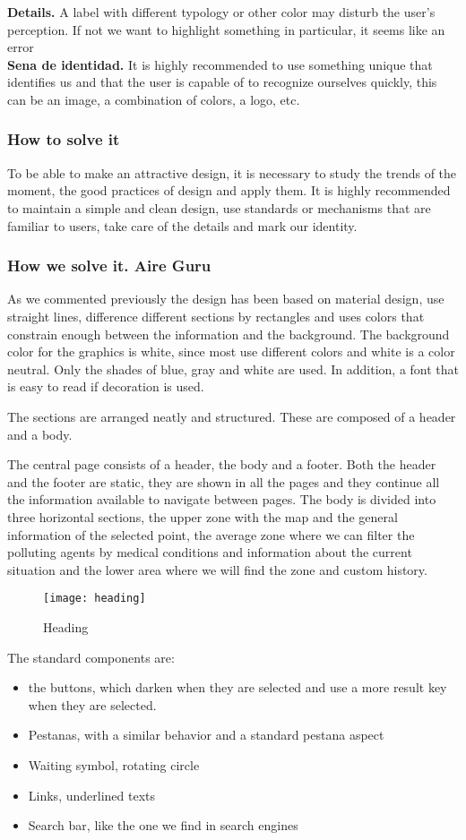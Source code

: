\textbf{Details.} A label with different typology or other color may disturb the user's perception. If not
we want to highlight something in particular, it seems like an error \\

\textbf{Sena de identidad.} It is highly recommended to use something unique that identifies us and that the user is capable of
to recognize ourselves quickly, this can be an image, a combination of colors, a logo, etc.
\subsubsection{How to solve it} 
To be able to make an attractive design, it is necessary to study the trends of the moment, the good practices of design and apply them.
It is highly recommended to maintain a simple and clean design, use standards or mechanisms that are familiar to users,
take care of the details and mark our identity.

\subsubsection{How we solve it. Aire Guru} 


As we commented previously the design has been based on material design, use straight lines, difference
different sections by rectangles and uses colors that constrain enough between the information and the background.
The background color for the graphics is white, since most use different colors and white is a color
neutral. Only the shades of blue, gray and white are used. In addition, a font that is easy to read if decoration is used.

The sections are arranged neatly and structured. These are composed of a header and a body.

The central page consists of a header, the body and a footer. Both the header and the footer are static,
they are shown in all the pages and they continue all the information available to navigate between pages.
The body is divided into three horizontal sections, the upper zone with the map and the general information of the selected point,
the average zone where we can filter the polluting agents by medical conditions and information about the current situation and the
lower area where we will find the zone and custom history.

\begin{figure}[ht]
    \centering
    \texttt{[image: heading]}
    \caption{Heading}
\end{figure}
The standard components are:
\begin{itemize}
\item the buttons, which darken when they are selected and use a more result key when they are selected.
\item Pestanas, with a similar behavior and a standard pestana aspect
\item Waiting symbol, rotating circle
\item Links, underlined texts
\item Search bar, like the one we find in search engines
\end{itemize}

